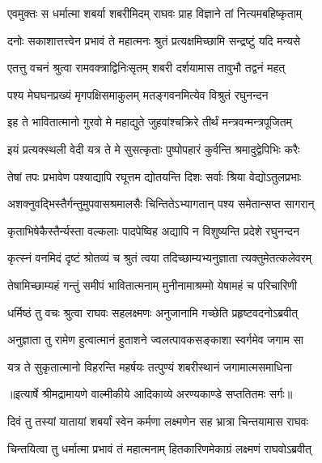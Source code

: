 \twolineshloka
{एवमुक्तः स धर्मात्मा शबर्या शबरीमिदम्}
{राघवः प्राह विज्ञाने तां नित्यमबहिष्कृताम्} %

\twolineshloka
{दनोः सकाशात्तत्त्वेन प्रभावं ते महात्मनः}
{श्रुतं प्रत्यक्षमिच्छामि सन्द्रष्टुं यदि मन्यसे} %

\twolineshloka
{एतत्तु वचनं श्रुत्वा रामवक्त्राद्विनिःसृतम्}
{शबरी दर्शयामास तावुभौ तद्वनं महत्} %

\twolineshloka
{पश्य मेघघनप्रख्यं मृगपक्षिसमाकुलम्}
{मतङ्गवनमित्येव विश्रुतं रघुनन्दन} %

\twolineshloka
{इह ते भावितात्मानो गुरवो मे महाद्युते}
{जुहवांश्चक्रिरे तीर्थं मन्त्रवन्मन्त्रपूजितम्} %

\twolineshloka
{इयं प्रत्यक्स्थली वेदी यत्र ते मे सुसत्कृताः}
{पुष्पोपहारं कुर्वन्ति श्रमादुद्वेपिभिः करैः} %

\twolineshloka
{तेषां तपः प्रभावेण पश्याद्यापि रघूत्तम}
{द्योतयन्ति दिशः सर्वाः श्रिया वेद्योऽतुलप्रभाः} %

\twolineshloka
{अशक्नुवद्भिस्तैर्गन्तुमुपवासश्रमालसैः}
{चिन्तितेऽभ्यागतान् पश्य समेतान्सप्त सागरान्} %

\twolineshloka
{कृताभिषेकैस्तैर्न्यस्ता वल्कलाः पादपेष्विह}
{अद्यापि न विशुष्यन्ति प्रदेशे रघुनन्दन} %

\twolineshloka
{कृत्स्नं वनमिदं दृष्टं श्रोतव्यं च श्रुतं त्वया}
{तदिच्छाम्यभ्यनुज्ञाता त्यक्तुमेतत्कलेवरम्} %

\twolineshloka
{तेषामिच्छाम्यहं गन्तुं समीपं भावितात्मनाम्}
{मुनीनामाश्रम्मो येषामहं च परिचारिणी} %

\twolineshloka
{धर्मिष्ठं तु वचः श्रुत्वा राघवः सहलक्ष्मणः}
{अनुजानामि गच्छेति प्रहृष्टवदनोऽब्रवीत्} %

\twolineshloka
{अनुज्ञाता तु रामेण हुत्वात्मानं हुताशने}
{ज्वलत्पावकसङ्काशा स्वर्गमेव जगाम सा} %

\twolineshloka
{यत्र ते सुकृतात्मानो विहरन्ति महर्षयः}
{तत्पुण्यं शबरीस्थानं जगामात्मसमाधिना} %


{॥इत्यार्षे श्रीमद्रामायणे वाल्मीकीये आदिकाव्ये अरण्यकाण्डे सप्ततितमः सर्गः॥}


\twolineshloka
{दिवं तु तस्यां यातायां शबर्यां स्वेन कर्मणा}
{लक्ष्मणेन सह भ्रात्रा चिन्तयामास राघवः} %

\twolineshloka
{चिन्तयित्वा तु धर्मात्मा प्रभावं तं महात्मनाम्}
{हितकारिणमेकाग्रं लक्ष्मणं राघवोऽब्रवीत्} %

